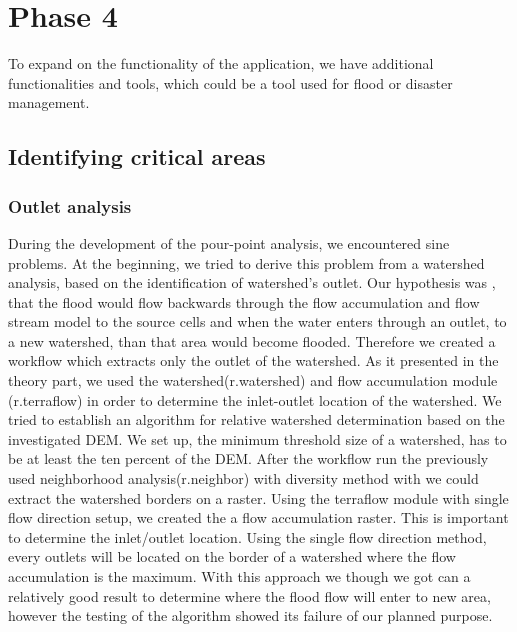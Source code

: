 \section{Phase 4}
To expand on the functionality of the application, we have additional functionalities and tools, which could be a tool used for flood or disaster management. 

\subsection{Identifying critical areas}
\subsubsection{Outlet analysis}
During the development of the pour-point analysis, we encountered sine problems. At the beginning, we tried to derive this problem from a watershed analysis, based on the identification of watershed's outlet. Our hypothesis was , that the flood  would flow backwards through the flow accumulation and flow stream model to the source cells and when the water enters through an outlet, to a new watershed, than that area would become flooded. Therefore we created a workflow which extracts only the outlet of the watershed. As it presented in the theory part, we used the watershed(r.watershed) and flow accumulation module (r.terraflow) in order to determine the inlet-outlet location of the watershed. We tried to establish an algorithm for relative watershed determination based on the investigated DEM. We set up, the minimum threshold size of a watershed, has to be at least the ten percent of the DEM. After the workflow run the previously used neighborhood analysis(r.neighbor) with diversity method with we could extract the watershed borders on a raster. Using the terraflow module with single flow direction setup, we created the a flow accumulation raster. This is important to determine the inlet/outlet location. Using the single flow direction method, every outlets will be located on the border of a watershed where the flow accumulation is the maximum. With this approach we though we got can a relatively good result to determine where the flood flow will enter to new area, however the testing of the algorithm showed its failure of our planned purpose.


